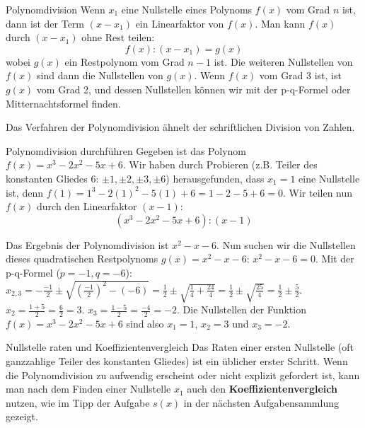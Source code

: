 \begin{merksatzumgebung}{Polynomdivision}
Wenn $x_1$ eine Nullstelle eines Polynoms $f(x)$ vom Grad $n$ ist, dann ist der Term $(x-x_1)$ ein Linearfaktor von $f(x)$. Man kann $f(x)$ durch $(x-x_1)$ ohne Rest teilen:
\[ f(x) : (x-x_1) = g(x) \]
wobei $g(x)$ ein Restpolynom vom Grad $n-1$ ist. Die weiteren Nullstellen von $f(x)$ sind dann die Nullstellen von $g(x)$.
Wenn $f(x)$ vom Grad 3 ist, ist $g(x)$ vom Grad 2, und dessen Nullstellen können wir mit der p-q-Formel oder Mitternachtsformel finden.
\end{merksatzumgebung}

Das Verfahren der Polynomdivision ähnelt der schriftlichen Division von Zahlen.

\begin{beispielumgebung}{Polynomdivision durchführen}
Gegeben ist das Polynom $f(x) = x^3 - 2x^2 - 5x + 6$. Wir haben durch Probieren (z.B. Teiler des konstanten Gliedes 6: $\pm 1, \pm 2, \pm 3, \pm 6$) herausgefunden, dass $x_1=1$ eine Nullstelle ist, denn $f(1) = 1^3 - 2(1)^2 - 5(1) + 6 = 1 - 2 - 5 + 6 = 0$.
Wir teilen nun $f(x)$ durch den Linearfaktor $(x-1)$:
\[ (x^3 - 2x^2 - 5x + 6) : (x-1) \]


Das Ergebnis der Polynomdivision ist $x^2 - x - 6$.
Nun suchen wir die Nullstellen dieses quadratischen Restpolynoms $g(x) = x^2 - x - 6$:
$x^2 - x - 6 = 0$. Mit der p-q-Formel ($p=-1, q=-6$):
$x_{2,3} = - \frac{-1}{2} \pm \sqrt{(\frac{-1}{2})^2 - (-6)} = \frac{1}{2} \pm \sqrt{\frac{1}{4} + \frac{24}{4}} = \frac{1}{2} \pm \sqrt{\frac{25}{4}} = \frac{1}{2} \pm \frac{5}{2}$.
$x_2 = \frac{1+5}{2} = \frac{6}{2} = 3$.
$x_3 = \frac{1-5}{2} = \frac{-4}{2} = -2$.
Die Nullstellen der Funktion $f(x) = x^3 - 2x^2 - 5x + 6$ sind also $x_1=1$, $x_2=3$ und $x_3=-2$.
\end{beispielumgebung}

\begin{tippumgebung}{Nullstelle raten und Koeffizientenvergleich}
Das Raten einer ersten Nullstelle (oft ganzzahlige Teiler des konstanten Gliedes) ist ein üblicher erster Schritt. Wenn die Polynomdivision zu aufwendig erscheint oder nicht explizit gefordert ist, kann man nach dem Finden einer Nullstelle $x_1$ auch den \textbf{Koeffizientenvergleich} nutzen, wie im Tipp der Aufgabe $s(x)$ in der nächsten Aufgabensammlung gezeigt.
\end{tippumgebung}


